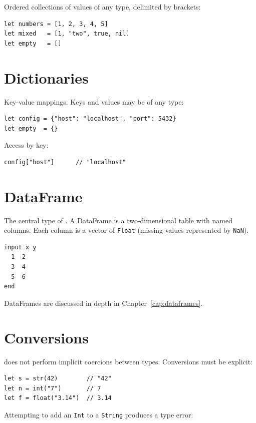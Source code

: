 Ordered collections of values of any type, delimited by brackets:

\begin{lstlisting}
let numbers = [1, 2, 3, 4, 5]
let mixed   = [1, "two", true, nil]
let empty   = []
\end{lstlisting}

\section{Dictionaries}

Key-value mappings. Keys and values may be of any type:

\begin{lstlisting}
let config = {"host": "localhost", "port": 5432}
let empty  = {}
\end{lstlisting}

Access by key:

\begin{lstlisting}
config["host"]      // "localhost"
\end{lstlisting}

\section{DataFrame}

The central type of \hayashi{}. A DataFrame is a two-dimensional table
with named columns. Each column is a vector of \texttt{Float} (missing
values represented by \texttt{NaN}).

\begin{lstlisting}[caption={Creating a DataFrame inline}]
input x y
  1  2
  3  4
  5  6
end
\end{lstlisting}

DataFrames are discussed in depth in Chapter~\ref{cap:dataframes}.

\section{Conversions}

\hayashi{} does not perform implicit coercions between types. Conversions
must be explicit:

\begin{lstlisting}
let s = str(42)        // "42"
let n = int("7")       // 7
let f = float("3.14")  // 3.14
\end{lstlisting}

Attempting to add an \texttt{Int} to a \texttt{String} produces a type
error:

